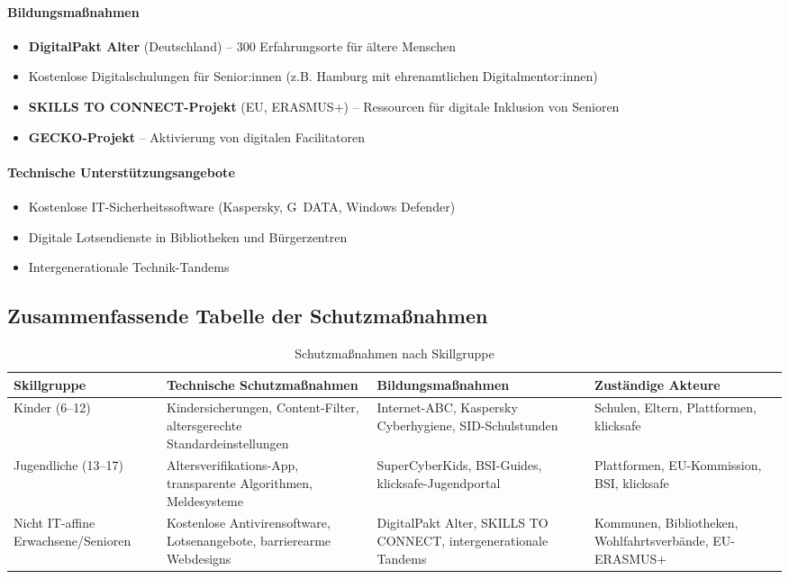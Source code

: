 \documentclass[11pt,a4paper]{article}
\begin{document}
	\paragraph{Bildungsmaßnahmen}
	\begin{itemize}
		\item \textbf{DigitalPakt Alter} (Deutschland) -- 300 Erfahrungsorte für ältere Menschen
		\item Kostenlose Digitalschulungen für Senior:innen (z.B. Hamburg mit ehrenamtlichen Digitalmentor:innen)
		\item \textbf{SKILLS TO CONNECT-Projekt} (EU, ERASMUS+) -- Ressourcen für digitale Inklusion von Senioren \cite{pls2025,eucomm2025}
		\item \textbf{GECKO-Projekt} -- Aktivierung von digitalen Facilitatoren
	\end{itemize}
	
	\paragraph{Technische Unterstützungsangebote}
	\begin{itemize}
		\item Kostenlose IT-Sicherheitssoftware (Kaspersky, G~DATA, Windows Defender)
		\item Digitale Lotsendienste in Bibliotheken und Bürgerzentren
		\item Intergenerationale Technik-Tandems
	\end{itemize}
	
	\subsection{Zusammenfassende Tabelle der Schutzmaßnahmen}
	\begin{table}[ht]
		\centering
		\caption{Schutzmaßnahmen nach Skillgruppe}
		\begin{tabularx}{\linewidth}{@{}lXXX@{}}
			\toprule
			Skillgruppe & Technische Schutzmaßnahmen & Bildungsmaßnahmen & Zuständige Akteure \\
			\midrule
			Kinder (6--12) & Kindersicherungen, Content-Filter, altersgerechte Standardeinstellungen & Internet-ABC, Kaspersky Cyberhygiene, SID-Schulstunden & Schulen, Eltern, Plattformen, klicksafe \\
			Jugendliche (13--17) & Altersverifikations-App, transparente Algorithmen, Meldesysteme & SuperCyberKids, BSI-Guides, klicksafe-Jugendportal & Plattformen, EU-Kommission, BSI, klicksafe \\
			Nicht IT-affine Erwachsene/Senioren & Kostenlose Antivirensoftware, Lotsenangebote, barrierearme Webdesigns & DigitalPakt Alter, SKILLS TO CONNECT, intergenerationale Tandems & Kommunen, Bibliotheken, Wohlfahrtsverbände, EU-ERASMUS+ \\
			\bottomrule
		\end{tabularx}
	\end{table}
	
\end{document}
